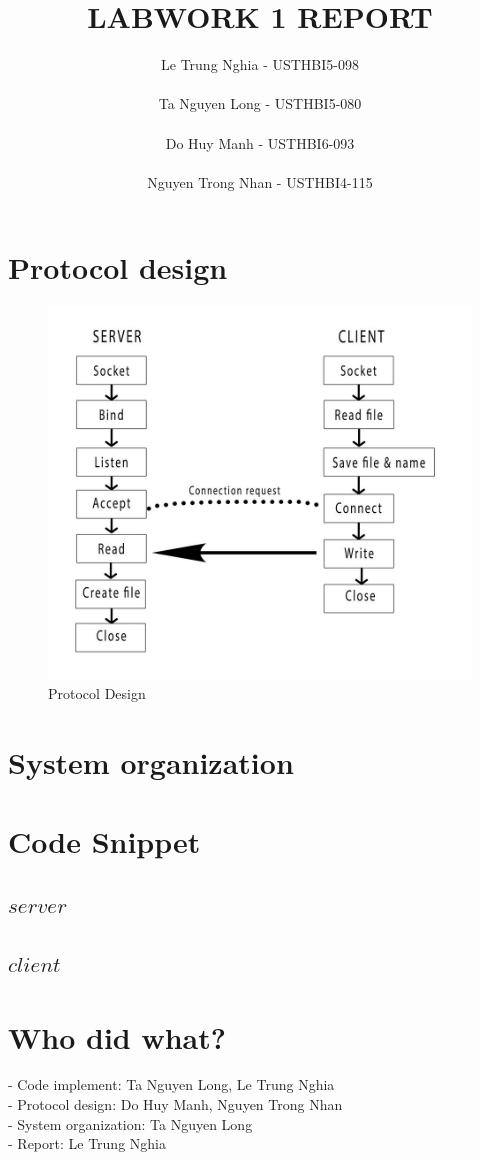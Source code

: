 \documentclass[12pt,a4paper]{article}
\title{LABWORK 1 REPORT}
\author{Le Trung Nghia - USTHBI5-098 \\ \\ Ta Nguyen Long - USTHBI5-080 \\ \\ Do Huy Manh - USTHBI6-093 \\ \\ Nguyen Trong Nhan - USTHBI4-115}
\begin{document}
\maketitle
\newpage 
\section{Protocol design}
\begin{figure}[!htb]
\includegraphics[width=\linewidth]{Protocol_design.jpg}
\caption{Protocol Design}
\end{figure}
\section{System organization}

\section{Code Snippet}
\subsection*{$server$}

\subsection*{$client$}

\section{Who did what?}
- Code implement: Ta Nguyen Long, Le Trung Nghia \\
- Protocol design: Do Huy Manh, Nguyen Trong Nhan \\ 
- System organization:  Ta Nguyen Long \\
- Report: Le Trung Nghia
\end{document}
